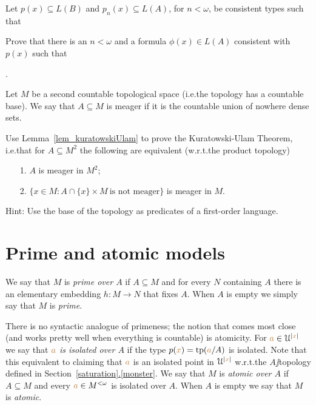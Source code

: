 \documentclass[creche.tex]{subfiles}
\begin{document}
\begin{exercise}
Let $p(x)\subseteq L(B)$ and $p_n(x)\subseteq L(A)$, for $n<\omega$, be consistent types such that\smallskip


\noindent Prove that there is an $n<\omega$ and a formula $\phi(x)\in L(A)$ consistent with $p(x)$ such that \smallskip

.\QED
\end{exercise}

\begin{exercise}
Let $M$ be a second countable topological space (i.e.\@ the topology has a countable base).
We say that $A\subseteq M$ is meager if it is the countable union of nowhere dense sets.

Use Lemma~\ref{lem_kuratowskiUlam} to prove the Kuratowski-Ulam Theorem, i.e.\@ that for $A\subseteq M^2$ the following are equivalent  (w.r.t.\@ the product topology)
\begin{itemize}
\item[1.] $A$ is meager in $M^2$;
\item[2.] $\Big\{x\in M : A\cap \{x\}{\times}M \ \textrm{is not meager}\Big\}$ is meager in $M$.
\end{itemize}
Hint: Use the base of the topology as predicates of a first-order language.\QED
\end{exercise}


\section{Prime and atomic models}

We say that $M$ is \emph{prime over $A$\/} if $A\subseteq M$ and for every $N$ containing $A$ there is an elementary embedding $h:M\to N$ that fixes $A$.
When $A$ is empty we simply say that $M$ is \emph{prime}.


There is no syntactic analogue of primeness; the notion that comes most close (and works pretty well when everything is countable) is atomicity.
For ${\color{brown} a}\in\EuScript U^{|{\color{brown} x}|}$ we say that \emph{${\color{brown} a}$ is isolated over $A$\/} if the type $p({\color{brown} x})={\rm tp}({\color{brown} a}/A)$ is isolated.
Note that this equivalent to claiming that ${\color{brown} a}$ is an isolated point in $\EuScript U^{|{\color{brown} x}|}$ w.r.t.\@ the $A\jj$topology defined in Section~\hyperref[saturation]{\ref*{saturation}.\ref*{monster}}.
We say that $M$ is \emph{atomic over $A$\/} if $A\subseteq M$ and every ${\color{brown} a}\in M^{<\omega}$ is isolated over $A$.
When $A$ is empty we say that $M$ is \emph{atomic}.
\end{document}
